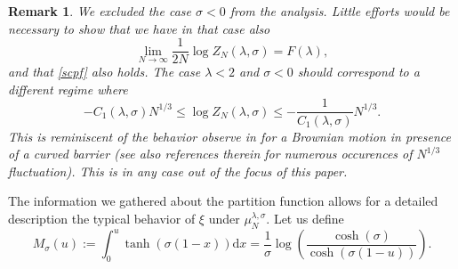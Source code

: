 \documentclass[reqno,11pt]{amsart}
\numberwithin{equation}{section}
\newcommand{\gl}{\lambda}
\newtheorem{rem}[theorem]{Remark}
\newcommand{\dd}{\mathrm{d}}
\begin{document}
 \begin{rem}
 We excluded the case $\sigma<0$ from the analysis.  Little efforts would be necessary to show that we have in that case also 
 \begin{equation}
 \lim_{N\to \infty}  \frac{1}{2N} \log  Z_N(\gl, \sigma)= F(\gl),
\end{equation}
and that \eqref{scpf} also holds. The case $\gl<2$ and $\sigma<0$ should correspond to a different regime where
\begin{equation}
  - C_1(\gl,\sigma) N^{1/3} \le  \log  Z_N(\gl, \sigma) \le - \frac{1}{C_1(\gl,\sigma)} N^{1/3}.
\end{equation}
This is reminiscent of the behavior observe in \cite{ferrari2005} for a Brownian motion in presence of a curved barrier (see also references therein for numerous occurences of $N^{1/3}$ fluctuation). This is in any case out of the focus of this paper.
\end{rem}
\noindent The information we gathered about the partition function allows for a detailed description the typical behavior of $\xi$ under $\mu^{\gl,\sigma}_N$.
Let us define
\begin{equation}
M_{\sigma}(u):= \int^u_0 \tanh ( \sigma(1-x) ) \dd x= \frac{1}{\sigma} \log \left(\frac{ \cosh (\sigma)}{  \cosh (\sigma(1-u))}\right). 
\end{equation}
\end{document}
